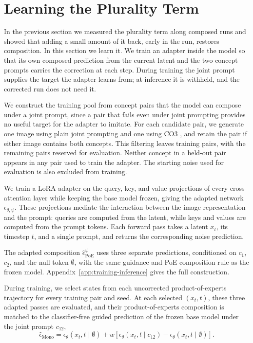 \section{Learning the Plurality Term}
\label{sec:method}
In the previous section we measured the plurality term along composed runs and showed that adding a small amount of it back, early in the run, restores composition. In this section we learn it. We train an adapter inside the model so that its own composed prediction from the current latent and the two concept prompts carries the correction at each step. During training the joint prompt supplies the target the adapter learns from; at inference it is withheld, and the corrected run does not need it.

We construct the training pool from concept pairs that the model can compose under a joint prompt, since a pair that fails even under joint prompting provides no useful target for the adapter to imitate. For each candidate pair, we generate one image using plain joint prompting and one using CO3 \citep{dutta2026steer}, and retain the pair if either image contains both concepts. This filtering leaves \trainpairs{} training pairs, with the remaining pairs reserved for evaluation. Neither concept in a held-out pair appears in any pair used to train the adapter. The starting noise used for evaluation is also excluded from training.

We train a LoRA adapter \citep{hu2022lora} on the query, key, and value projections of every cross-attention layer while keeping the base model frozen, giving the adapted network $\epsilon_{\theta,\psi}$. These projections mediate the interaction between the image representation and the prompt: queries are computed from the latent, while keys and values are computed from the prompt tokens. Each forward pass takes a latent $x_t$, its timestep $t$, and a single prompt, and returns the corresponding noise prediction.

The adapted composition $\hat\epsilon^{\psi}_{\mathrm{PoE}}$ uses three separate predictions,
conditioned on $c_1$, $c_2$, and the null token $\emptyset$, with the same guidance and PoE composition
rule as the frozen model. Appendix~\ref{app:training-inference} gives the full construction.

During training, we select \statesperrun{} states from each uncorrected product-of-experts trajectory for every training pair and seed. At each selected $(x_t,t)$, these three adapted passes are evaluated, and their product-of-experts composition is matched to the classifier-free guided prediction of the frozen base model under the joint prompt $c_{12}$,
\begin{equation}
\hat\epsilon_{\mathrm{Mono}} = \epsilon_\theta(x_t, t \mid \emptyset)
  + w\left[ \epsilon_\theta(x_t, t \mid c_{12}) - \epsilon_\theta(x_t, t \mid \emptyset) \right].
\label{eq:mono-target}
\end{equation}

